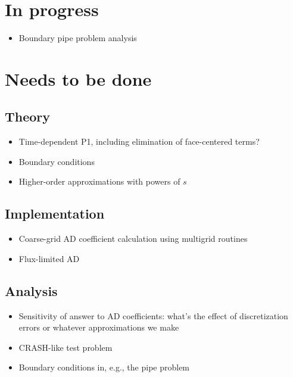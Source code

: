 \documentclass[11pt]{SRJresearch}
\begin{document}
\section{In progress}

\begin{itemize}
  \item Boundary pipe problem analysis
\end{itemize}

\section{Needs to be done}

\subsection{Theory}
\begin{itemize}
  \item Time-dependent P1, including elimination of face-centered terms?
  \item Boundary conditions
  \item Higher-order approximations with powers of $s$
\end{itemize}

\subsection{Implementation}
\begin{itemize}
  \item Coarse-grid AD coefficient calculation using multigrid routines
  \item Flux-limited AD
\end{itemize}

\subsection{Analysis}
\begin{itemize}
  \item Sensitivity of answer to AD coefficients: what's the effect of
    discretization errors or whatever approximations we make
  \item CRASH-like test problem
  \item Boundary conditions in, e.g., the pipe problem
\end{itemize}


\end{document}
